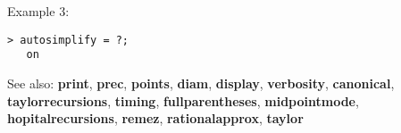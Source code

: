 \noindent Example 3: 
\begin{center}\begin{minipage}{14.8cm}\begin{Verbatim}[frame=single]
   > autosimplify = ?; 
   on
\end{Verbatim}
\end{minipage}\end{center}
See also: \textbf{print}, \textbf{prec}, \textbf{points}, \textbf{diam}, \textbf{display}, \textbf{verbosity}, \textbf{canonical}, \textbf{taylorrecursions}, \textbf{timing}, \textbf{fullparentheses}, \textbf{midpointmode}, \textbf{hopitalrecursions}, \textbf{remez}, \textbf{rationalapprox}, \textbf{taylor}
